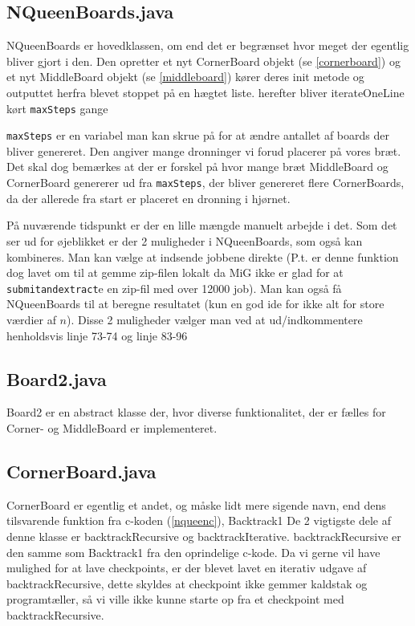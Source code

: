 \documentclass[final,a4paper,11pt]{article}
\begin{document}
\subsection{NQueenBoards.java}

NQueenBoards er hovedklassen, om end det er begrænset hvor meget der egentlig
bliver gjort i den. Den opretter et nyt CornerBoard objekt (se
\ref{cornerboard}) og et nyt MiddleBoard objekt (se \ref{middleboard})
kører deres init metode og outputtet herfra blevet stoppet på en hægtet
liste. 
herefter bliver iterateOneLine kørt \texttt{maxSteps} gange

\texttt{maxSteps} er en variabel man kan skrue på for at
ændre antallet af boards der bliver genereret. Den angiver mange dronninger vi
forud placerer på vores bræt. Det skal dog bemærkes at der er forskel på hvor
mange bræt MiddleBoard og CornerBoard genererer ud fra \texttt{maxSteps}, der
bliver genereret flere CornerBoards, da der allerede fra start er placeret en
dronning i hjørnet.

På nuværende tidspunkt er der en lille mængde manuelt arbejde i det. Som det ser
ud for øjeblikket er der 2 muligheder i NQueenBoards, som også kan kombineres. 
Man kan vælge at indsende jobbene direkte (P.t. er denne funktion dog lavet om
til at gemme zip-filen lokalt da MiG ikke er glad for at \texttt{submitandextract}e en
zip-fil med over 12000 job). Man kan også få NQueenBoards til at beregne
resultatet (kun en god ide for ikke alt for store værdier af $n$). Disse 2
muligheder vælger man ved at ud/indkommentere henholdsvis linje 73-74 og linje
83-96 

\subsection{Board2.java}

Board2 er en abstract klasse der, hvor diverse funktionalitet, der er fælles for
Corner- og MiddleBoard er implementeret.

\subsection{CornerBoard.java}
\label{impcornerboard}

CornerBoard er egentlig et andet, og måske lidt mere sigende navn, end dens
tilsvarende funktion fra c-koden (\ref{nqueenc}), Backtrack1 De 2 vigtigste
dele af denne klasse er backtrackRecursive og backtrackIterative.
backtrackRecursive er den samme som Backtrack1 fra den oprindelige c-kode. Da vi
gerne vil have mulighed for at lave checkpoints, er der blevet lavet en iterativ
udgave af backtrackRecursive, dette skyldes at checkpoint ikke gemmer kaldstak
og programtæller, så vi ville ikke kunne starte op fra et checkpoint med
backtrackRecursive. 
\end{document}
